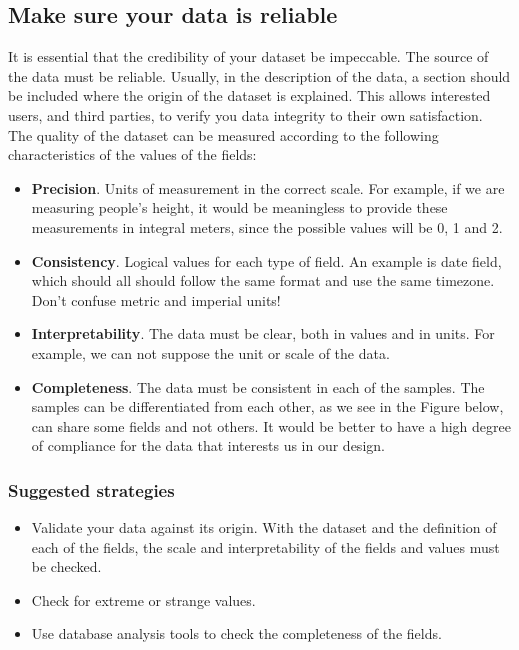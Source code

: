 \subsection{Make sure your data is reliable}

It is essential that the credibility of your dataset be impeccable. The source of the data must be reliable.
Usually, in the description of the data, a section should be included where the origin of the dataset is explained.
This allows interested users, and third parties, to verify you data integrity to their own satisfaction. \\

The quality of the dataset can be measured according to the following characteristics of the values of the fields:

\begin{itemize}
    \item \textbf{Precision}. Units of measurement in the correct scale. For example, if we are measuring people's height, it 
    would be meaningless to provide these measurements in integral meters, since the possible values will be 0, 1 and 2. \\

    \item \textbf{Consistency}. Logical values for each type of field. An example is date field, which should all should
    follow the same format and use the same timezone. Don't confuse metric and imperial units!\\

    \item \textbf{Interpretability}. The data must be clear, both in values and in units. For example, we can not
    suppose the unit or scale of the data.

    \item \textbf{Completeness}. The data must be consistent in each of the samples. The samples can be differentiated
    from each other, as we see in the Figure below, can share some fields and not others. It would be
    better to have a high degree of compliance for the data that interests us in our design.
\end{itemize}

\subsubsection*{Suggested strategies} 

\begin{itemize}
    \item Validate your data against its origin. With the dataset and the definition
    of each of the fields, the scale and interpretability of the fields and values must be checked.
    \item Check for extreme or strange values.
    \item Use database analysis tools to check the completeness of the fields.
\end{itemize}

